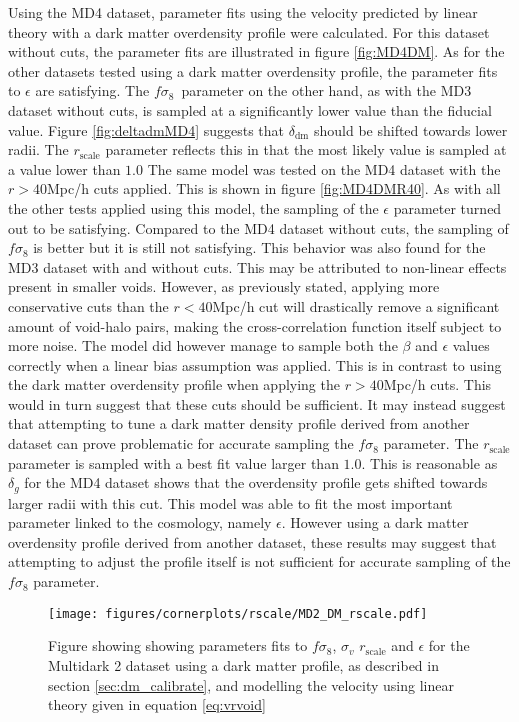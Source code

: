 Using the MD4 dataset, parameter fits using the velocity predicted by linear theory with a dark matter overdensity profile were calculated. For this dataset without cuts, the parameter fits are illustrated in figure \ref{fig:MD4DM}. As for the other datasets tested using a dark matter overdensity profile, the parameter fits to $\epsilon$ are satisfying. The $f\sigma_8$ parameter on the other hand, as with the MD3 dataset without cuts, is sampled at a significantly lower value than the fiducial value. Figure \ref{fig:deltadmMD4} suggests that $\delta_{\mathrm{dm}}$ should be shifted towards lower radii. The $r_{\mathrm{scale}}$ parameter reflects this in that the most likely value is sampled at a value lower than $1.0$ The same model was tested on the MD4 dataset with the $r>40$Mpc/h cuts applied. This is shown in figure \ref{fig:MD4DMR40}. As with all the other tests applied using this model, the sampling of the $\epsilon$ parameter turned out to be satisfying. Compared to the MD4 dataset without cuts, the sampling of $f\sigma_8$ is better but it is still not satisfying. This behavior was also found for the MD3 dataset with and without cuts. This may be attributed to non-linear effects present in smaller voids. However, as previously stated, applying more conservative cuts than the $r<40$Mpc/h cut will drastically remove a significant amount of void-halo pairs, making the cross-correlation function itself subject to more noise. The model did however manage to sample both the $\beta$ and $\epsilon$ values correctly when a linear bias assumption was applied. This is in contrast to using the dark matter overdensity profile when applying the $r>40$Mpc/h cuts. This would in turn suggest that these cuts should be sufficient. It may instead suggest that attempting to tune a dark matter density profile derived from another dataset can prove problematic for accurate sampling the $f\sigma_8$ parameter. The $r_\mathrm{scale}$ parameter is sampled with a best fit value larger than $1.0$. This is reasonable as $\delta_g$ for the MD4 dataset shows that the overdensity profile gets shifted towards larger radii with this cut. This model was able to fit the most important parameter linked to the cosmology, namely $\epsilon$. However using a dark matter overdensity profile derived from another dataset, these results may suggest that attempting to adjust the profile itself is not sufficient for accurate sampling of the $f\sigma_8$ parameter.

\begin{figure}[H]
    \texttt{[image: figures/cornerplots/rscale/MD2\_DM\_rscale.pdf]}
    \caption{Figure showing showing parameters fits to $f\sigma_8$, $\sigma_v$ $r_{\mathrm{scale}}$ and $\epsilon$ for the Multidark 2 dataset using a dark matter profile, as described in section \ref{sec:dm_calibrate}, and modelling the velocity using linear theory given in equation \ref{eq:vrvoid}}
    \label{fig:MD2DM}
\end{figure}

